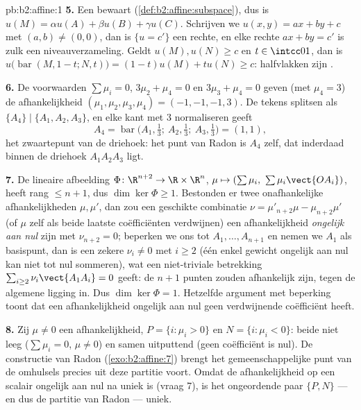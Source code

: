 \begin{solution}{pb:b2:affine:1}
\textbf{5.} Een  bewaart 
(\cref{def:b2:affine:subspace}), dus is $u(M) = \alpha u(A) + \beta
u(B) + \gamma u(C)$. Schrijven we $u(x, y) = ax + by + c$ met $(a,
b) \neq (0,0)$, dan is $\{u = c'\}$ een rechte, en elke rechte $ax
+ by = c'$ is zulk een niveauverzameling. Geldt $u(M), u(N) \geq c$
en $t \in \intcc01$, dan is $u\bigl(\operatorname{bar}(M, 1-t; N,
t)\bigr) = (1-t)u(M) + tu(N) \geq c$: halfvlakken zijn .

\textbf{6.} De voorwaarden $\sum\mu_i = 0$, $3\mu_2 + \mu_4 = 0$ en
$3\mu_3 + \mu_4 = 0$ geven (met $\mu_4 = 3$) de afhankelijkheid
$(\mu_1, \mu_2, \mu_3, \mu_4) = (-1, -1, -1, 3)$. De tekens
splitsen als $\{A_4\} \mid \{A_1, A_2, A_3\}$, en elke kant met $3$
normaliseren geeft
\[
A_4 = \operatorname{bar}\bigl(A_1, \tfrac13;\ A_2, \tfrac13;\
A_3, \tfrac13\bigr) = (1,1),
\]
het zwaartepunt van de driehoek: het punt van Radon is $A_4$ zelf,
dat inderdaad binnen de driehoek $A_1A_2A_3$ ligt.

\textbf{7.} De lineaire afbeelding $\Phi \colon \R^{n+2} \to \R
\times \R^n$, $\mu \mapsto (\sum\mu_i,\ \sum\mu_i\vect{OA_i})$,
heeft rang $\leq n + 1$, dus $\dim\ker \Phi \geq 1$. Bestonden er
twee onafhankelijke afhankelijkheden $\mu, \mu'$, dan zou een
geschikte combinatie $\nu = \mu'_{n+2}\mu - \mu_{n+2}\mu'$ (of
$\mu$ zelf als beide laatste coëfficiënten verdwijnen) een
afhankelijkheid \emph{ongelijk aan nul} zijn met $\nu_{n+2} = 0$;
beperken we ons tot $A_1, \dots, A_{n+1}$ en nemen we $A_1$ als
basispunt, dan is een zekere $\nu_i \neq 0$ met $i \geq 2$ (één
enkel gewicht ongelijk aan nul kan niet tot nul sommeren), wat een
niet-triviale betrekking $\sum_{i\geq2}\nu_i\vect{A_1A_i} = 0$
geeft: de $n+1$ punten zouden  afhankelijk zijn, tegen de
algemene ligging in. Dus $\dim\ker \Phi = 1$. Hetzelfde argument
met beperking toont dat een afhankelijkheid ongelijk aan nul geen
verdwijnende coëfficiënt heeft.

\textbf{8.} Zij $\mu \neq 0$ een afhankelijkheid, $P = \{i : \mu_i
> 0\}$ en $N = \{i : \mu_i < 0\}$: beide niet leeg ($\sum\mu_i =
0$, $\mu \neq 0$) en samen uitputtend (geen coëfficiënt is nul). De
constructie van Radon (\cref{exo:b2:affine:7}) brengt het
gemeenschappelijke punt van de omhulsels precies uit deze partitie
voort. Omdat de afhankelijkheid op een scalair ongelijk aan nul na
uniek is (vraag 7), is het ongeordende paar $\{P, N\}$ --- en dus
de partitie van Radon --- uniek.


\end{solution}
